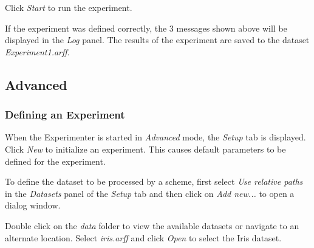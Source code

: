 \begin{center}
\end{center}


Click \textit{Start} to run the experiment.

\begin{center}
\end{center}


If the experiment was defined correctly, the 3 messages shown above will be displayed in the \textit{Log} panel. The results of the experiment are saved to the dataset \textit{Experiment1.arff}. 


\newpage
\subsection{Advanced}

\subsubsection{Defining an Experiment}

When the Experimenter is started in \textit{Advanced} mode, the \textit{Setup} tab is displayed. Click \textit{New} to initialize an experiment. This causes default parameters to be defined for the experiment.
\begin{center}
\end{center}

To define the dataset to be processed by a scheme, first select \textit{Use relative paths} in the \textit{Datasets} panel of the \textit{Setup} tab and then click on \textit{Add new...} to open a dialog window.
\begin{center}
\end{center}

Double click on the \textit{data} folder to view the available datasets or navigate to an alternate location. Select \textit{iris.arff} and click \textit{Open} to select the Iris dataset.
\begin{center}
\end{center}
	
\begin{center}
\end{center}

